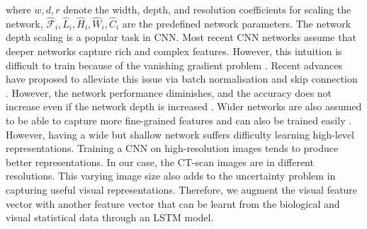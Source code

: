 \documentclass[conference]{IEEEtran}
\begin{document}
where $w,d,r$ denote the width, depth, and resolution coefficients for scaling the network, $\hat{\mathcal{F}}_{i}, \hat{L}_{i}, \hat{H}_{i}, \hat{W}_{i}, \hat{C}_{i}$ are the predefined network parameters. The network depth scaling is a popular task in CNN. Most recent CNN networks assume that deeper networks capture rich and complex features. However, this intuition is difficult to train because of the vanishing gradient problem \cite{zagoruyko2016wide}. Recent advances have proposed to alleviate this issue via batch normalisation \cite{ioffe2015batch} and skip connection \cite{he2016deep}. However, the network performance diminishes, and the accuracy does not increase even if the network depth is increased \cite{tan2019efficientnet}. Wider networks are also assumed to be able to capture more fine-grained features and can also be trained easily \cite{tan2019mnasnet}. However, having a wide but shallow network suffers difficulty learning high-level representations. Training a CNN on high-resolution images tends to produce better representations. In our case, the CT-scan images are in different resolutions. This varying image size also adds to the uncertainty problem in capturing useful visual representations. Therefore, we augment the visual feature vector with another feature vector that can be learnt from the biological and visual statistical data through an LSTM model.
\end{document}

